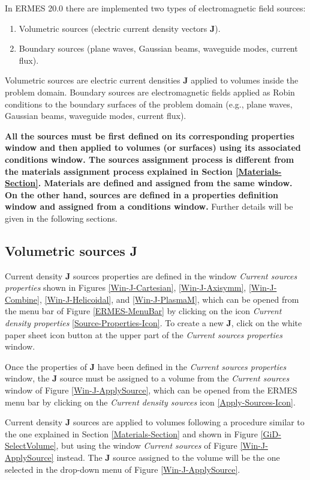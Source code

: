 In ERMES 20.0 there are implemented two types of electromagnetic field sources: 
\begin{enumerate}\itemsep0em 
	\item Volumetric sources (electric current density vectors \textbf{J}).
	\item Boundary sources (plane waves, Gaussian beams, waveguide modes, current flux).
\end{enumerate}
Volumetric sources are electric current densities \textbf{J} applied to volumes inside the problem domain. Boundary sources are electromagnetic fields applied as Robin conditions to the boundary surfaces of the problem domain (e.g., plane waves, Gaussian beams, waveguide modes, current flux). 

\textbf{All the sources must be first defined on its corresponding properties window and then applied to volumes (or surfaces) using its associated conditions window. The sources assignment process is different from the materials assignment process explained in Section \ref{Materials-Section}. Materials are defined and assigned from the same window. On the other hand, sources are defined in a properties definition window and assigned from a conditions window.} Further details will be given in the following sections.

\subsection{Volumetric sources J}

Current density \textbf{J} sources properties are defined in the window \textit{Current sources properties} shown in Figures \ref{Win-J-Cartesian}, \ref{Win-J-Axisymm}, \ref{Win-J-Combine}, \ref{Win-J-Helicoidal}, and \ref{Win-J-PlasmaM}, which can be opened from the menu bar of Figure \ref{ERMES-MenuBar} by clicking on the icon \textit{Current density properties} \ref{Source-Properties-Icon}. To create a new \textbf{J}, click on the white paper sheet icon button at the upper part of the \textit{Current sources properties} window.

Once the properties of \textbf{J} have been defined in the \textit{Current sources properties} window, the \textbf{J} source must be assigned to a volume from the \textit{Current sources} window of Figure \ref{Win-J-ApplySource}, which can be opened from the ERMES menu bar by clicking on the \textit{Current density sources} icon \ref{Apply-Sources-Icon}. 

Current density \textbf{J} sources are applied to volumes following a procedure similar to the one explained in Section \ref{Materials-Section} and shown in Figure \ref{GiD-SelectVolume}, but using the window \textit{Current sources} of Figure \ref{Win-J-ApplySource} instead. The \textbf{J} source assigned to the volume will be the one selected in the drop-down menu of Figure \ref{Win-J-ApplySource}.


